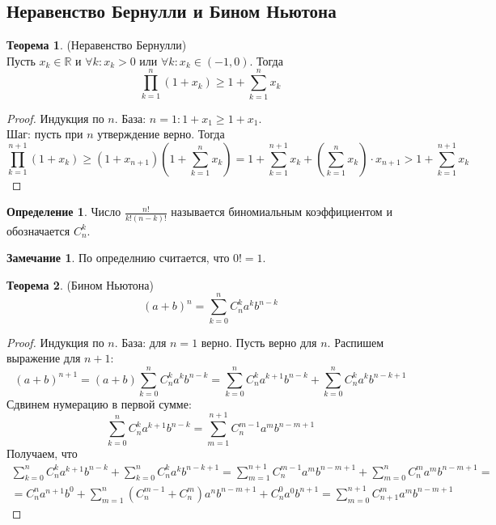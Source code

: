 \documentclass[a4paper, 12pt]{article}
\newcommand{\R}{\mathbb{R}}
\theoremstyle{definition}
\newtheorem*{definition}{Определение}
\newtheorem*{theorem}{Теорема}
\newtheorem*{comm}{Замечание}
\begin{document}
        \subsection{Неравенство Бернулли и Бином Ньютона}
        \begin{theorem} (Неравенство Бернулли)\\
            Пусть $x_k\in \R$ и $\forall k: x_k>0$ или $\forall k: x_k\in (-1, 0)$. Тогда
            \[\prod\limits_{k=1}^n(1+x_k)\geq 1+\sum\limits_{k=1}^nx_k\]
        \end{theorem} 
        \begin{proof}
            Индукция по $n$.
            База: $n=1: 1+x_1\geq 1+x_1$.\\
            Шаг: пусть при $n$ утверждение верно. Тогда
            \[\prod\limits_{k=1}^{n+1}(1+x_k)\geq(1+x_{n+1})(1+\sum\limits_{k=1}^n x_k)=1+\sum\limits_{k=1}^{n+1}x_k+(\sum\limits_{k=1}^{n}x_k)\cdot x_{n+1}> 1+\sum\limits_{k=1}^{n+1}x_k\]
        \end{proof}
        \begin{definition}
            Число $\frac{n!}{k!(n-k)!}$ называется биномиальным коэффициентом и обозначается $C_n^k$.
        \end{definition} 
        \begin{comm}
            По определнию считается, что $0!=1$.
        \end{comm} 
        \begin{theorem} (Бином Ньютона)
            \[(a+b)^n=\sum\limits_{k=0}^n C_n^k a^k b^{n-k}\]
        \end{theorem} 
        \begin{proof}
            Индукция по $n$. База: для $n=1$ верно. Пусть верно для $n$. Распишем выражение для $n+1$:
            \[(a+b)^{n+1}=(a+b)\sum\limits_{k=0}^n C_n^k a^k b^{n-k}=\sum\limits_{k=0}^n C_n^k a^{k+1} b^{n-k}+\sum\limits_{k=0}^n C_n^k a^k b^{n-k+1}\]
            Сдвинем нумерацию в первой сумме:
            \[\sum\limits_{k=0}^n C_n^k a^{k+1} b^{n-k}=\sum\limits_{m=1}^{n+1} C_n^{m-1} a^{m} b^{n-m+1}\]
            Получаем, что
            \begin{multline*}
            \sum\limits_{k=0}^n C_n^k a^{k+1} b^{n-k}+\sum\limits_{k=0}^n C_n^k a^k b^{n-k+1}=\sum\limits_{m=1}^{n+1} C_n^{m-1} a^{m} b^{n-m+1}+\sum\limits_{m=0}^n C_n^m a^m b^{n-m+1}=\\=C_n^n a^{n+1}b^0+\sum\limits_{m=1}^n(C_n^{m-1}+C_n^m)a^n b^{n-m+1}+C_n^0a^0b^{n+1}=\sum\limits_{m=0}^{n+1}C_{n+1}^m a^m b^{n-m+1}
            \end{multline*}
        \end{proof}
\end{document}

